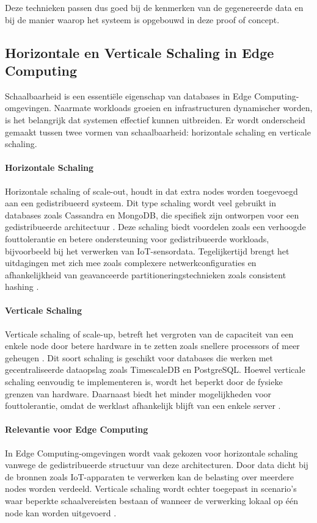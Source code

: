 Deze technieken passen dus goed bij de kenmerken van de gegenereerde data en bij de manier waarop het systeem is opgebouwd in deze proof of concept.

\subsection{Horizontale en Verticale Schaling in Edge Computing}

Schaalbaarheid is een essentiële eigenschap van databases in Edge Computing-omgevingen. Naarmate workloads groeien en infrastructuren dynamischer worden, is het belangrijk dat systemen effectief kunnen uitbreiden. Er wordt onderscheid gemaakt tussen twee vormen van schaalbaarheid: horizontale schaling en verticale schaling.

\paragraph{Horizontale Schaling}
Horizontale schaling of scale-out, houdt in dat extra nodes worden toegevoegd aan een gedistribueerd systeem. Dit type schaling wordt veel gebruikt in databases zoals Cassandra en MongoDB, die specifiek zijn ontworpen voor een gedistribueerde architectuur \autocite{Kleppmann2017}.  
Deze schaling biedt voordelen zoals een verhoogde fouttolerantie en betere ondersteuning voor gedistribueerde workloads, bijvoorbeeld bij het verwerken van IoT-sensordata. 
Tegelijkertijd brengt het uitdagingen met zich mee zoals complexere netwerkconfiguraties en afhankelijkheid van geavanceerde partitioneringstechnieken zoals consistent hashing \autocite{Mahmud2020}.

\paragraph{Verticale Schaling}
Verticale schaling of scale-up, betreft het vergroten van de capaciteit van een enkele node door betere hardware in te zetten zoals snellere processors of meer geheugen \autocite{Ponnusamy2024}. 
Dit soort schaling is geschikt voor databases die werken met gecentraliseerde dataopslag zoals TimescaleDB en PostgreSQL. 
Hoewel verticale schaling eenvoudig te implementeren is, wordt het beperkt door de fysieke grenzen van hardware. 
Daarnaast biedt het minder mogelijkheden voor fouttolerantie, omdat de werklast afhankelijk blijft van een enkele server \autocite{Mahmud2020}.

\paragraph{Relevantie voor Edge Computing}
In Edge Computing-omgevingen wordt vaak gekozen voor horizontale schaling vanwege de gedistribueerde structuur van deze architecturen. 
Door data dicht bij de bronnen zoals IoT-apparaten te verwerken kan de belasting over meerdere nodes worden verdeeld. 
Verticale schaling wordt echter toegepast in scenario's waar beperkte schaalvereisten bestaan of wanneer de verwerking lokaal op één node kan worden uitgevoerd \autocite{Kleppmann2017}.

